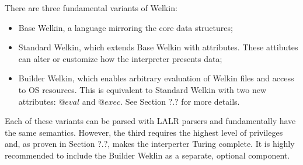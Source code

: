 There are three fundamental variants of Welkin:
\begin{itemize}
	\item Base Welkin, a language mirroring the core data structures;
	\item Standard Welkin, which extends Base Welkin with attributes. These attibutes can alter or customize how the interpreter presents data;
	\item Builder Welkin, which enables arbitrary evaluation of Welkin files and access to OS resources. This is equivalent to Standard Welkin with two new attributes: $@eval$ and $@exec.$ See Section ?.? for more details.
\end{itemize}
Each of these variants can be parsed with LALR parsers and fundamentally have the same semantics. However, the third requires the highest level of privileges and, as proven in Section ?.?, makes the interperter Turing complete. It is highly recommended to include the Builder Weklin as a separate, optional component.
